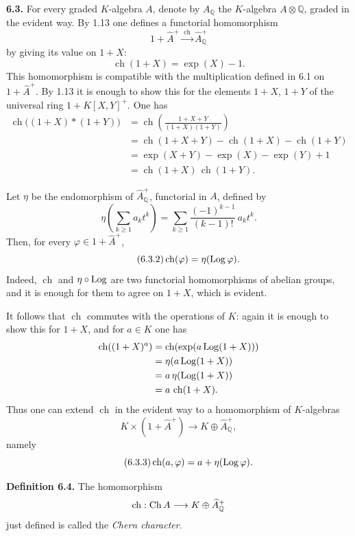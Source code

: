\documentclass[11pt]{article}
\newcommand{\ch}{\operatorname{ch}}
\providecommand{\ch}{\operatorname{ch}}
\begin{document}
\textbf{6.3.} For every graded \(K\)-algebra \(A\), denote by \(A_{\mathbb Q}\) the \(K\)-algebra \(A\otimes\mathbb Q\), graded in the evident way. By 1.13 one defines a functorial homomorphism
\[
  1+\widehat A^+\xrightarrow{\ \ch\ }\widehat A_{\mathbb Q}^{+}
\]
by giving its value on \(1+X\):
\begin{equation}\tag{6.3.1}
  \ch(1+X)=\exp(X)-1.
\end{equation}
This homomorphism is compatible with the multiplication defined in 6.1 on \(1+\widehat A^+\). By 1.13 it is enough to show this for the elements \(1+X\), \(1+Y\) of the universal ring \(1+K[X,Y]^+\). One has
\[
\begin{aligned}
 \ch\bigl((1+X)*(1+Y)\bigr)
 &= \ch\!\left(\frac{1+X+Y}{(1+X)(1+Y)}\right)\\
 &= \ch(1+X+Y)-\ch(1+X)-\ch(1+Y)\\
 &= \exp(X+Y)-\exp(X)-\exp(Y)+1\\
 &= \ch(1+X)\,\ch(1+Y).
\end{aligned}
\]

Let \(\eta\) be the endomorphism of \(\widehat A_{\mathbb Q}^{+}\), functorial in \(A\), defined by
\[
 \eta\!\left(\sum_{k\ge1} a_k t^k\right)
 =
 \sum_{k\ge1}\frac{(-1)^{k-1}}{(k-1)!}\,a_k t^k.
\]
Then, for every \(\varphi\in1+\widehat A^+\),
\begin{equation}\tag{6.3.2}
  \ch(\varphi)=\eta(\Log\varphi).
\end{equation}
Indeed, \(\ch\) and \(\eta\circ\operatorname{Log}\) are two functorial homomorphisms of abelian groups, and it is enough for them to agree on \(1+X\), which is evident.

It follows that \(\ch\) commutes with the operations of \(K\): again it is enough to show this for \(1+X\), and for \(a\in K\) one has
\[
\begin{aligned}
 \ch((1+X)^a)
 &=\ch(\exp(a\Log(1+X)))\\
 &=\eta(a\Log(1+X))\\
 &=a\,\eta(\Log(1+X))\\
 &=a\,\ch(1+X).
\end{aligned}
\]
Thus one can extend \(\ch\) in the evident way to a homomorphism of \(K\)-algebras
\[
  K\times(1+\widehat A^+)\longrightarrow K\oplus\widehat A_{\mathbb Q}^{+},
\]
namely
\begin{equation}\tag{6.3.3}
  \ch(a,\varphi)=a+\eta(\Log\varphi).
\end{equation}

\textbf{Definition 6.4.} The homomorphism
\[
  \ch:\Ch A\longrightarrow K\oplus\widehat A_{\mathbb Q}^{+}
\]
just defined is called the \emph{Chern character}.
\end{document}
